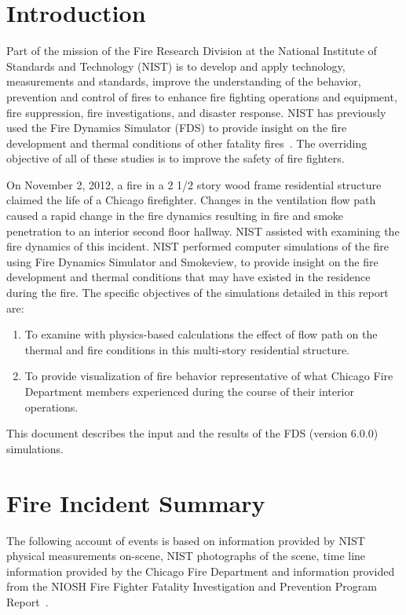 \documentclass[11pt,oneside]{book}
\begin{document}
\mainmatter

\chapter{Introduction}
Part of the mission of the Fire Research Division at the National Institute of Standards and Technology (NIST) is to develop and apply technology, measurements and standards, improve the understanding of the behavior, prevention and control of fires to enhance fire fighting operations and equipment, fire suppression, fire investigations, and disaster response. NIST has previously used the Fire Dynamics Simulator (FDS) to provide insight on the fire development and thermal conditions of other fatality fires~\cite{Madrzykowski:1,Iowa,Texas,Cook_County,Grosshandler:Station,Bryner:Charleston,barowy:texas}. The overriding objective of all of these studies is to improve the safety of fire fighters.

On November 2, 2012, a fire in a 2 1/2 story wood frame residential structure claimed the life of a Chicago firefighter.  Changes in the ventilation flow path caused a rapid change in the fire dynamics resulting in fire and smoke penetration to an interior second floor hallway. NIST assisted with examining the fire dynamics of this incident. NIST performed computer simulations of the fire using Fire Dynamics Simulator and Smokeview, to provide insight on the fire development and thermal conditions that may have existed in the residence during the fire. The specific objectives of the simulations detailed in this report are: 
\begin{enumerate}
\item To examine with physics-based calculations the effect of flow path on the thermal and fire conditions in this multi-story residential structure.
\item To provide visualization of fire behavior representative of what Chicago Fire Department members experienced during the course of their interior operations.
\end{enumerate}
This document describes the input and the results of the FDS (version 6.0.0) simulations.



\chapter{Fire Incident Summary}
The following account of events is based on information provided by NIST physical measurements on-scene, NIST photographs of the scene, time line information provided by the Chicago Fire Department and information provided from the NIOSH Fire Fighter Fatality Investigation and Prevention Program Report~\cite{NIOSH:Bowyer}.
\end{document}
